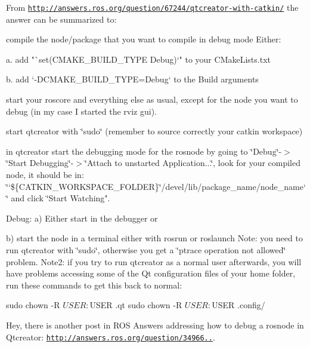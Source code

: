 From {\ttfamily \href{http://answers.ros.org/question/67244/qtcreator-with-catkin/}{\tt http\-://answers.\-ros.\-org/question/67244/qtcreator-\/with-\/catkin/}} the answer can be summarized to\-:


\begin{DoxyEnumerate}
\item compile the node/package that you want to compile in debug mode Either\-: \begin{DoxyVerb}        a. add "`set(CMAKE_BUILD_TYPE Debug)`" to your CMakeLists.txt

        b. add `-DCMAKE_BUILD_TYPE=Debug` to the Build arguments
\end{DoxyVerb}

\item start your roscore and everything else as usual, except for the node you want to debug (in my case I started the rviz gui).
\item start qtcreator with \char`\"{}sudo\char`\"{} (remember to source correctly your catkin workspace)
\item in qtcreator start the debugging mode for the rosnode by going to \char`\"{}\-Debug\char`\"{}-\/$>$\char`\"{}\-Start Debugging\char`\"{}-\/$>$\char`\"{}\-Attach to unstarted Application...\char`\"{}, look for your compiled node, it should be in\-: \char`\"{}`\$\{\-C\-A\-T\-K\-I\-N\-\_\-\-W\-O\-R\-K\-S\-P\-A\-C\-E\-\_\-\-F\-O\-L\-D\-E\-R\}\char`\"{}/devel/lib/package\-\_\-name/node\-\_\-name`\char`\"{} and click \char`\"{}Start Watching".
\item Debug\-: a) Either start in the debugger or

b) start the node in a terminal either with rosrun or roslaunch Note\-: you need to run qtcreator with \char`\"{}sudo\char`\"{}, otherwise you get a \char`\"{}ptrace operation not allowed\char`\"{} problem. Note2\-: if you try to run qtcreator as a normal user afterwards, you will have problems accessing some of the Qt configuration files of your home folder, run these commands to get this back to normal\-: \begin{DoxyVerb}sudo chown -R ${USER}:${USER} .qt
sudo chown -R ${USER}:${USER} .config/
\end{DoxyVerb}

\end{DoxyEnumerate}

Hey, there is another post in R\-O\-S Answers addressing how to debug a rosnode in Qtcreator\-: \href{http://answers.ros.org/question/34966..}{\tt http\-://answers.\-ros.\-org/question/34966..}.

